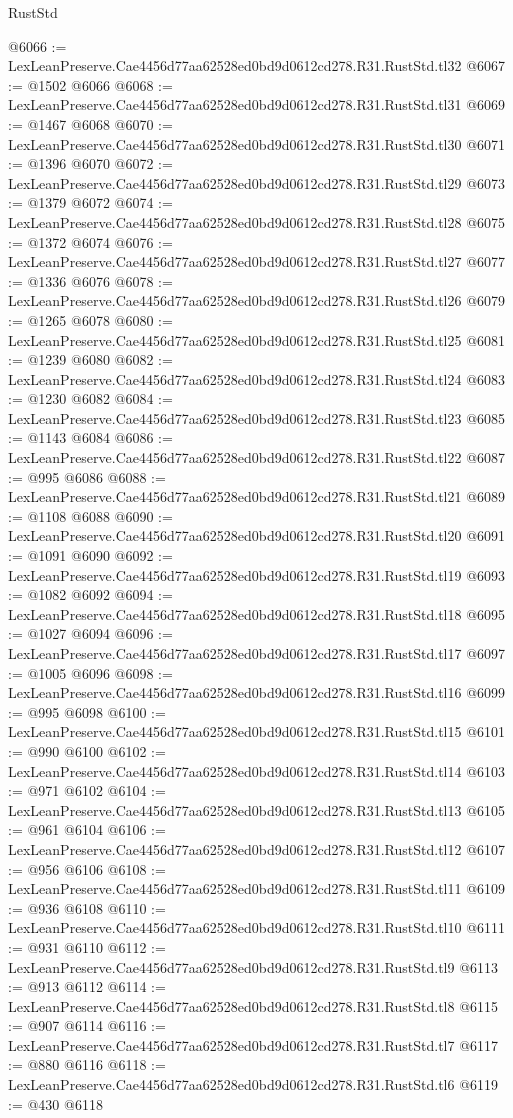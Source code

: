 \begin{lexlean}{RustStd}
\begin{coremodule}
@6066 := LexLeanPreserve.Cae4456d77aa62528ed0bd9d0612cd278.R31.RustStd.tl32
@6067 := @1502 @6066
@6068 := LexLeanPreserve.Cae4456d77aa62528ed0bd9d0612cd278.R31.RustStd.tl31
@6069 := @1467 @6068
@6070 := LexLeanPreserve.Cae4456d77aa62528ed0bd9d0612cd278.R31.RustStd.tl30
@6071 := @1396 @6070
@6072 := LexLeanPreserve.Cae4456d77aa62528ed0bd9d0612cd278.R31.RustStd.tl29
@6073 := @1379 @6072
@6074 := LexLeanPreserve.Cae4456d77aa62528ed0bd9d0612cd278.R31.RustStd.tl28
@6075 := @1372 @6074
@6076 := LexLeanPreserve.Cae4456d77aa62528ed0bd9d0612cd278.R31.RustStd.tl27
@6077 := @1336 @6076
@6078 := LexLeanPreserve.Cae4456d77aa62528ed0bd9d0612cd278.R31.RustStd.tl26
@6079 := @1265 @6078
@6080 := LexLeanPreserve.Cae4456d77aa62528ed0bd9d0612cd278.R31.RustStd.tl25
@6081 := @1239 @6080
@6082 := LexLeanPreserve.Cae4456d77aa62528ed0bd9d0612cd278.R31.RustStd.tl24
@6083 := @1230 @6082
@6084 := LexLeanPreserve.Cae4456d77aa62528ed0bd9d0612cd278.R31.RustStd.tl23
@6085 := @1143 @6084
@6086 := LexLeanPreserve.Cae4456d77aa62528ed0bd9d0612cd278.R31.RustStd.tl22
@6087 := @995 @6086
@6088 := LexLeanPreserve.Cae4456d77aa62528ed0bd9d0612cd278.R31.RustStd.tl21
@6089 := @1108 @6088
@6090 := LexLeanPreserve.Cae4456d77aa62528ed0bd9d0612cd278.R31.RustStd.tl20
@6091 := @1091 @6090
@6092 := LexLeanPreserve.Cae4456d77aa62528ed0bd9d0612cd278.R31.RustStd.tl19
@6093 := @1082 @6092
@6094 := LexLeanPreserve.Cae4456d77aa62528ed0bd9d0612cd278.R31.RustStd.tl18
@6095 := @1027 @6094
@6096 := LexLeanPreserve.Cae4456d77aa62528ed0bd9d0612cd278.R31.RustStd.tl17
@6097 := @1005 @6096
@6098 := LexLeanPreserve.Cae4456d77aa62528ed0bd9d0612cd278.R31.RustStd.tl16
@6099 := @995 @6098
@6100 := LexLeanPreserve.Cae4456d77aa62528ed0bd9d0612cd278.R31.RustStd.tl15
@6101 := @990 @6100
@6102 := LexLeanPreserve.Cae4456d77aa62528ed0bd9d0612cd278.R31.RustStd.tl14
@6103 := @971 @6102
@6104 := LexLeanPreserve.Cae4456d77aa62528ed0bd9d0612cd278.R31.RustStd.tl13
@6105 := @961 @6104
@6106 := LexLeanPreserve.Cae4456d77aa62528ed0bd9d0612cd278.R31.RustStd.tl12
@6107 := @956 @6106
@6108 := LexLeanPreserve.Cae4456d77aa62528ed0bd9d0612cd278.R31.RustStd.tl11
@6109 := @936 @6108
@6110 := LexLeanPreserve.Cae4456d77aa62528ed0bd9d0612cd278.R31.RustStd.tl10
@6111 := @931 @6110
@6112 := LexLeanPreserve.Cae4456d77aa62528ed0bd9d0612cd278.R31.RustStd.tl9
@6113 := @913 @6112
@6114 := LexLeanPreserve.Cae4456d77aa62528ed0bd9d0612cd278.R31.RustStd.tl8
@6115 := @907 @6114
@6116 := LexLeanPreserve.Cae4456d77aa62528ed0bd9d0612cd278.R31.RustStd.tl7
@6117 := @880 @6116
@6118 := LexLeanPreserve.Cae4456d77aa62528ed0bd9d0612cd278.R31.RustStd.tl6
@6119 := @430 @6118

\end{coremodule}
\end{lexlean}

